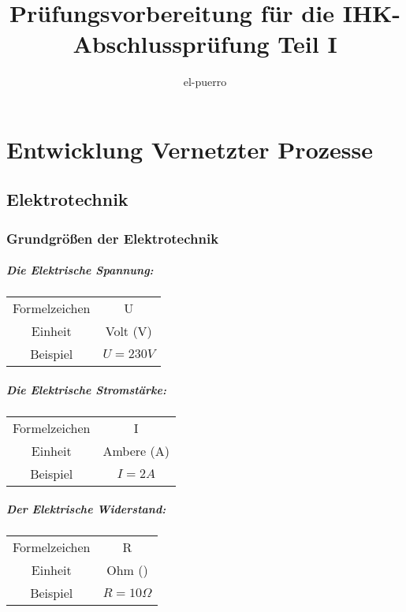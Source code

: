 \documentclass[11pt]{scrartcl}
\begin{document}
\title{Prüfungsvorbereitung für die IHK-Abschlussprüfung Teil I}
\author{el-puerro}

\chapter{Entwicklung Vernetzter Prozesse}
\section{Elektrotechnik}
\subsection{Grundgrößen der Elektrotechnik}

\paragraph{Die Elektrische Spannung:}
\begin{center}
	\begin{tabular}{ |c|c| }
		Formelzeichen & U            \\
		Einheit       & Volt (V)     \\
		Beispiel      & $ U = 230V $ \\
	\end{tabular}
\end{center}

\paragraph{Die Elektrische Stromstärke:}
\begin{center}
	\begin{tabular}{ |c|c| }
		Formelzeichen & I            \\
		Einheit       & Ambere (A)   \\
		Beispiel      & $ I = 2A $   \\
	\end{tabular}
\end{center}

\paragraph{Der Elektrische Widerstand:}
\begin{center}
	\begin{tabular}{ |c|c| }
		Formelzeichen & R            \\
		Einheit       & Ohm (\Omega)   \\
		Beispiel      & $ R = 10\Omega $   \\
	\end{tabular}
\end{center}
\end{document}
